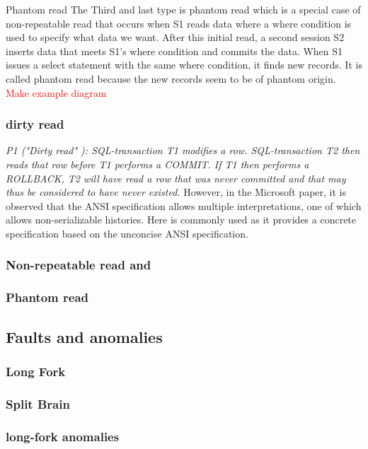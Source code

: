 \documentclass[a4paper,10pt,titlepage]{report}
\begin{document}
Phantom read
The Third and last type is phantom read which is a special case of non-repeatable read that occurs when S1 reads data where a where condition is used to specify what data we want. After this initial read, a second session S2 inserts data that meets S1's where condition and commits the data. When S1 issues a select statement with the same where condition, it finds new records. It is called phantom read because the new records seem to be of phantom origin.
 \textcolor{red}{Make example diagram}


\subsubsection{dirty read}

\textit{P1 ("Dirty read" ): SQL-transaction T1 modifies a row. SQL-transaction T2 then reads that row before T1 performs a COMMIT. If T1 then performs a ROLLBACK, T2 will have read a row that was never committed and that may thus be considered to have never existed.} However, in the Microsoft paper, \cite{Berensonetal} it is observed that the ANSI specification allows multiple interpretations, one of which allows non-serializable histories. Here \cite{Adya99weakconsistency:} is commonly used as it provides a concrete specification based on the unconcise ANSI specification. 


\subsubsection{Non-repeatable read and}
\subsubsection{Phantom read}


\subsection{Faults and anomalies}

\subsubsection{Long Fork}

\subsubsection{Split Brain}

\subsubsection{long-fork anomalies}
\end{document}
